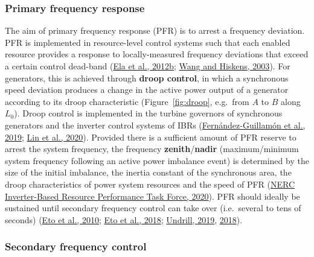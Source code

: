 \documentclass[12pt,a4paper,]{report}
\begin{document}
\hypertarget{sec:lit_review-balancing_practices-pfr}{%
\subsubsection{Primary frequency
response}\label{sec:lit_review-balancing_practices-pfr}}

The aim of primary frequency response (PFR) is to arrest a frequency
deviation. PFR is implemented in resource-level control systems such
that each enabled resource provides a response to locally-measured
frequency deviations that exceed a certain control dead-band
(\protect\hyperlink{ref-elaAlternativeApproachesIncentivizing2012}{Ela
et al., 2012b};
\protect\hyperlink{ref-wangReviewAGCImplementation2003}{Wang and
Hiskens, 2003}). For generators, this is achieved through \textbf{droop
control}, in which a synchronous speed deviation produces a change in
the active power output of a generator according to its droop
characteristic (Figure~\ref{fig:droop}, e.g.~from \(A\) to \(B\) along
\(L_0\)). Droop control is implemented in the turbine governors of
synchronous generators and the inverter control systems of IBRs
(\protect\hyperlink{ref-fernandez-guillamonPowerSystemsHigh2019}{Fernández-Guillamón
et al., 2019};
\protect\hyperlink{ref-linResearchRoadmapGridForming2020}{Lin et al.,
2020}). Provided there is a sufficient amount of PFR reserve to arrest
the system frequency, the frequency \textbf{zenith}/\textbf{nadir}
(maximum/minimum system frequency following an active power imbalance
event) is determined by the size of the initial imbalance, the inertia
constant of the synchronous area, the droop characteristics of power
system resources and the speed of PFR
(\protect\hyperlink{ref-nercinverter-basedresourceperformancetaskforceFastFrequencyResponse2020}{NERC
Inverter-Based Resource Performance Task Force, 2020}). PFR should
ideally be sustained until secondary frequency control can take over
(i.e.~several to tens of seconds)
(\protect\hyperlink{ref-etoUseFrequencyResponse2010}{Eto et al., 2010};
\protect\hyperlink{ref-etoFrequencyControlRequirements2018}{Eto et al.,
2018}; \protect\hyperlink{ref-undrillNotesFrequencyControl2019}{Undrill,
2019},
\protect\hyperlink{ref-undrillPrimaryFrequencyResponse2018}{2018}).

\hypertarget{secondary-frequency-control}{%
\subsubsection{Secondary frequency
control}\label{secondary-frequency-control}}
\end{document}
